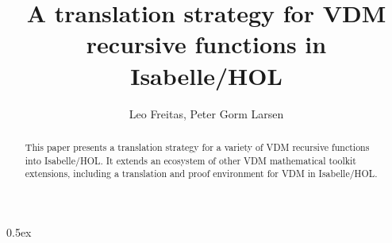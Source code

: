 \documentclass[11pt,a4paper]{article}
\begin{document}
\title{A translation strategy for VDM recursive functions in Isabelle/HOL}
\author{Leo Freitas, Peter Gorm Larsen}


			
\maketitle
\setcounter{footnote}{0} 
\begin{abstract}
    This paper presents a translation strategy for a variety of VDM recursive functions into Isabelle/HOL. 
     It extends an ecosystem of other VDM mathematical toolkit extensions, including a translation and proof environment for VDM in Isabelle/HOL.
\end{abstract}



\parindent 0pt\parskip 0.5ex




 
\end{document}
